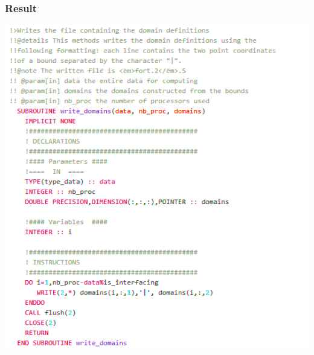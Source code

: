 \documentclass[10p]{beamer}
\begin{document}
\begin{frame}
\frametitle{Result}
\includegraphics[width=1.1\textwidth]{Image/final_code_0.png}
\end{frame}
\end{document}
